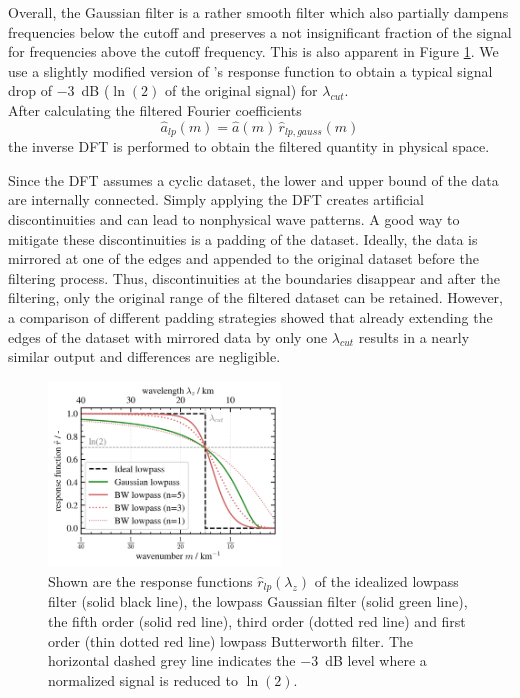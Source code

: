 Overall, the Gaussian filter is a rather smooth filter which also partially dampens frequencies below the cutoff and preserves a not insignificant fraction of the signal for frequencies above the cutoff frequency. This is also apparent in Figure \ref{fig:filter_comp}. We use a slightly modified version of \textcite[]{kruse_gravity_2015}'s response function to obtain a typical signal drop of \SI{-3}{dB} ($\ln(2)$ of the original signal) for $\lambda_{cut}$.\\
After calculating the filtered Fourier coefficients
\begin{equation}
    \hat{a}_{lp}(m) = \hat{a}(m) \, \hat{r}_{lp,gauss}(m)
\label{equ:a_hat}
\end{equation}
the inverse DFT is performed to obtain the filtered quantity in physical space.

Since the DFT assumes a cyclic dataset, the lower and upper bound of the data are internally connected. Simply applying the DFT creates artificial discontinuities and can lead to nonphysical wave patterns. A good way to mitigate these discontinuities is a padding of the dataset. Ideally, the data is mirrored at one of the edges and appended to the original dataset before the filtering process. Thus, discontinuities at the boundaries disappear and after the filtering, only the original range of the filtered dataset can be retained. However, a comparison of different padding strategies showed that already extending the edges of the dataset with mirrored data by only one $\lambda_{cut}$ results in a nearly similar output and differences are negligible.

%
\begin{figure}[t]
    \centering
    \includegraphics[width=0.55\textwidth]{figures_methods/filter_comparison.png}
    \caption{Shown are the response functions $\hat{r}_{lp}(\lambda_z)$ of the idealized lowpass filter (solid black line), the lowpass Gaussian filter (solid green line), the fifth order (solid red line), third order (dotted red line) and first order (thin dotted red line) lowpass Butterworth filter. The horizontal dashed grey line indicates the \SI{-3}{dB} level where a normalized signal is reduced to $\ln(2)$.}
    \label{fig:filter_comp}
\end{figure}
%
